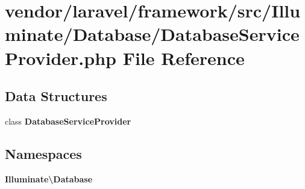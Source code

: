 \section{vendor/laravel/framework/src/\+Illuminate/\+Database/\+Database\+Service\+Provider.php File Reference}
\label{_database_service_provider_8php}
\subsection*{Data Structures}
\begin{DoxyCompactItemize}
\item 
class {\bf Database\+Service\+Provider}
\end{DoxyCompactItemize}
\subsection*{Namespaces}
\begin{DoxyCompactItemize}
\item 
 {\bf Illuminate\textbackslash{}\+Database}
\end{DoxyCompactItemize}
